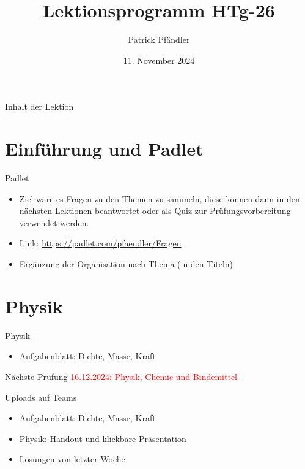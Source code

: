 



\title{\textbf{Lektionsprogramm HTg-26}}
\author{Patrick Pfändler}
\date{11. November 2024}




\frame{\titlepage}

\begin{frame}{Inhalt der Lektion}
    \tableofcontents
\end{frame}


\section{Einführung und Padlet}

\begin{frame}{Padlet}
\begin{itemize}
	\item[\textbullet] Ziel wäre es Fragen zu den Themen zu sammeln, diese können dann in den nächsten Lektionen beantwortet oder als Quiz zur Prüfungsvorbereitung verwendet werden.
	\item[\textbullet] Link: \url{https://padlet.com/pfaendler/Fragen}
	\item[\textbullet] Ergänzung der Organisation nach Thema (in den Titeln)
\end{itemize}
\end{frame}

\section{Physik}
\begin{frame}{Physik}
	\begin{itemize}
		\item[\textbullet] Aufgabenblatt:	Dichte, Masse, Kraft
	\end{itemize}
\end{frame}

\begin{frame}{Nächste Prüfung}
    \textcolor{red}{16.12.2024: Physik, Chemie und Bindemittel}
\end{frame}


\begin{frame}{Uploads auf Teams}
    \begin{itemize}
        \item [\textbullet] Aufgabenblatt: Dichte, Masse, Kraft
        \item [\textbullet] Physik: Handout und klickbare Präsentation
        \item [\textbullet] Lösungen von letzter Woche
    \end{itemize}
\end{frame}

\folieFragen


